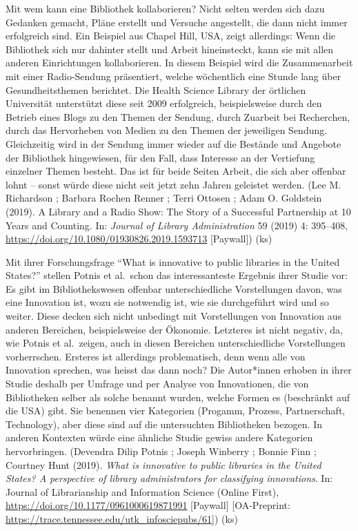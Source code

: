 \documentclass[a4paper,
fontsize=11pt,
oneside,
numbers=noperiodatend,
parskip=half-,
bibliography=totoc,
final
]{scrartcl}
\begin{document}
Mit wem kann eine Bibliothek kollaborieren? Nicht selten werden sich
dazu Gedanken gemacht, Pläne erstellt und Versuche angestellt, die dann
nicht immer erfolgreich sind. Ein Beispiel aus Chapel Hill, USA, zeigt
allerdings: Wenn die Bibliothek sich nur dahinter stellt und Arbeit
hineinsteckt, kann sie mit allen anderen Einrichtungen kollaborieren. In
diesem Beispiel wird die Zusammenarbeit mit einer Radio-Sendung
präsentiert, welche wöchentlich eine Stunde lang über Gesundheitsthemen
berichtet. Die Health Science Library der örtlichen Universität
unterstützt diese seit 2009 erfolgreich, beispielsweise durch den
Betrieb eines Blogs zu den Themen der Sendung, durch Zuarbeit bei
Recherchen, durch das Hervorheben von Medien zu den Themen der
jeweiligen Sendung. Gleichzeitig wird in der Sendung immer wieder auf
die Bestände und Angebote der Bibliothek hingewiesen, für den Fall, dass
Interesse an der Vertiefung einzelner Themen besteht. Das ist für beide
Seiten Arbeit, die sich aber offenbar lohnt -- sonst würde diese nicht
seit jetzt zehn Jahren geleistet werden. (Lee M. Richardson ; Barbara
Rochen Renner ; Terri Ottosen ; Adam O. Goldstein (2019). A Library and
a Radio Show: The Story of a Successful Partnership at 10 Years and
Counting. In: \emph{Journal of Library Administration} 59 (2019) 4:
395--408, \url{https://doi.org/10.1080/01930826.2019.1593713}
{[}Paywall{]}) (ks)

Mit ihrer Forschungsfrage \enquote{What is innovative to public
libraries in the United States?} stellen Potnis et al.~schon das
interessanteste Ergebnis ihrer Studie vor: Es gibt im Bibliothekswesen
offenbar unterschiedliche Vorstellungen davon, was eine Innovation ist,
wozu sie notwendig ist, wie sie durchgeführt wird und so weiter. Diese
decken sich nicht unbedingt mit Vorstellungen von Innovation aus anderen
Bereichen, beispielsweise der Ökonomie. Letzteres ist nicht negativ, da,
wie Potnis et al.~zeigen, auch in diesen Bereichen unterschiedliche
Vorstellungen vorherrschen. Ersteres ist allerdings problematisch, denn
wenn alle von Innovation sprechen, was heisst das dann noch? Die
Autor*innen erhoben in ihrer Studie deshalb per Umfrage und per Analyse
von Innovationen, die von Bibliotheken selber als solche benannt wurden,
welche Formen es (beschränkt auf die USA) gibt. Sie benennen vier
Kategorien (Progamm, Prozess, Partnerschaft, Technology), aber diese
sind auf die untersuchten Bibliotheken bezogen. In anderen Kontexten
würde eine ähnliche Studie gewiss andere Kategorien hervorbringen.
(Devendra Dilip Potnis ; Joseph Winberry ; Bonnie Finn ; Courtney Hunt
(2019). \emph{What is innovative to public libraries in the United
States? A perspective of library administrators for classifying
innovations}. In: Journal of Librarianship and Information Science
(Online First), \url{https://doi.org/10.1177/0961000619871991}
{[}Paywall{]} {[}OA-Preprint:
\url{https://trace.tennessee.edu/utk_infosciepubs/61}{]})
(ks)
\end{document}
